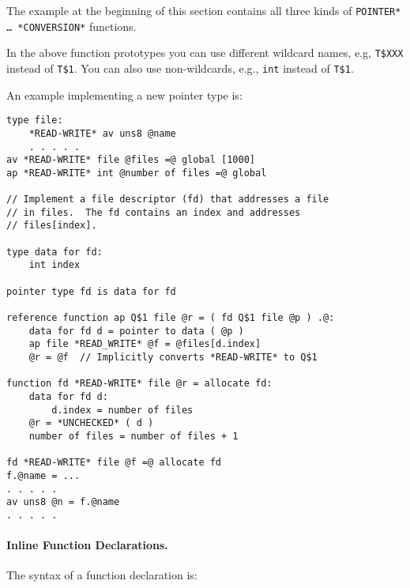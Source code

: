 \documentclass[12pt]{article}
\newcommand{\subsubsubsection}[1]{\paragraph[#1]{#1.}}
\newenvironment{indpar}[1][0.3in]%
	{\begin{list}{}%
		     {\setlength{\itemsep}{0in}%
		      \setlength{\topsep}{0in}%
		      \setlength{\parsep}{1ex}%
		      \setlength{\labelwidth}{#1}%
		      \setlength{\leftmargin}{#1}%
		      \addtolength{\leftmargin}{\labelsep}}%
	 \item}%
	{\end{list}}
\begin{document}
The example at the beginning of this section contains
all three kinds of {\tt *POINTER* \ldots{} *CONVERSION*} functions.

In the above function prototypes you can use different wildcard names,
e.g, {\tt T\$XXX} instead of {\tt T\$1}.  You can also
use non-wildcards, e.g., {\tt int} instead of {\tt T\$1}.

An example implementing a new pointer type is:

\begin{indpar}\begin{verbatim}
type file:
    *READ-WRITE* av uns8 @name
    . . . . .
av *READ-WRITE* file @files =@ global [1000]
ap *READ-WRITE* int @number of files =@ global

// Implement a file descriptor (fd) that addresses a file
// in files.  The fd contains an index and addresses
// files[index].

type data for fd:
    int index

pointer type fd is data for fd

reference function ap Q$1 file @r = ( fd Q$1 file @p ) .@:
    data for fd d = pointer to data ( @p )
    ap file *READ_WRITE* @f = @files[d.index]
    @r = @f  // Implicitly converts *READ-WRITE* to Q$1

function fd *READ-WRITE* file @r = allocate fd:
    data for fd d:
        d.index = number of files
    @r = *UNCHECKED* ( d )
    number of files = number of files + 1

fd *READ-WRITE* file @f =@ allocate fd
f.@name = ...
. . . . .
av uns8 @n = f.@name
. . . . .
\end{verbatim}\end{indpar}

\subsubsubsection{Inline Function Declarations}
\label{INLINE-FUNCTION-DECLARATIONS}

The syntax of a function declaration is:
\end{document}
